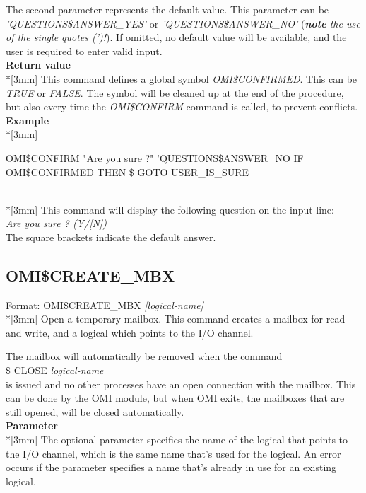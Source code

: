 \documentclass[a4paper]{book}
\renewcommand{\indent}{\hspace*{5mm}}
\begin{document}
The second parameter represents the default value. This parameter can be 
\textsl{'QUESTIONS{\$}ANSWER{\_}YES'} or \textsl{'QUESTIONS{\$}ANSWER{\_}NO'} (\textit{\textbf{note} the use of the single quotes (')!}). If omitted, no default 
value will be available, and the user is required to enter valid input.\\[3mm]
\textbf{Return value}\\*[3mm]
This command defines a global symbol \textsl{OMI{\$}CONFIRMED}. This can be \textsl{TRUE} or \textsl{FALSE}. The symbol will be 
cleaned up at the end of the procedure, but also every time the 
\textsl{OMI{\$}CONFIRM} command is called, to prevent conflicts.\\[3mm]
\textbf{Example}\\*[3mm]
\begin{textsf}
\indent{\$} OMI{\$}CONFIRM "Are you sure ?" 'QUESTIONS{\$}ANSWER{\_}NO \newline
\indent{\$} IF OMI{\$}CONFIRMED THEN {\$} GOTO USER{\_}IS{\_}SURE
\end{textsf}\\*[3mm]
This command will display the following question on the input line: \\
\indent\textsl{Are you sure ? (Y/[N])} \\
The square brackets indicate the default answer.

\subsection{OMI{\$}CREATE{\_}MBX}
\label{subsubsec:mylabel47}

\indent Format: \textsf{OMI{\$}CREATE{\_}MBX \textit{[logical-name]}}\\*[3mm]
Open a temporary mailbox. This command creates a mailbox 
for read and write, and a logical which points to the I/O channel. 

The mailbox will automatically be removed when the command \\
\indent\textsf{{\$} CLOSE \textit{logical-name}} \\
is issued and no other processes have an open connection 
with the mailbox. This can be done by the OMI module, but when OMI exits, 
the mailboxes that are still opened, will be closed automatically.\\[3mm]
\textbf{Parameter}\\*[3mm]
The optional parameter specifies the name of the logical that points to the 
I/O channel, which is the same name that's used for the logical. An error 
occurs if the parameter specifies a name that's already in use for an 
existing logical.
\end{document}
